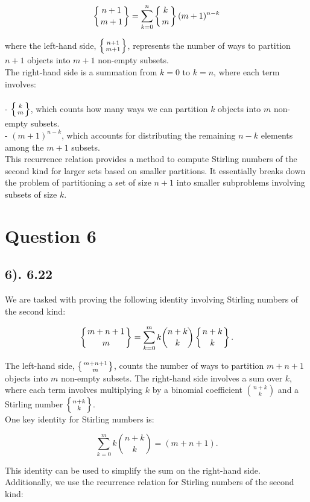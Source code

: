 \documentclass[12pt]{article}
\begin{document}
\[
\left\{ n+1 \atop m+1 \right\} = \sum_{k=0}^{n} \left\{ k \atop m \right\} (m+1)^{n-k}
\]

where the left-hand side, \( \left\{ n+1 \atop m+1 \right\} \), represents the number of ways to partition \( n+1 \) objects into \( m+1 \) non-empty subsets.\\

The right-hand side is a summation from \( k = 0 \) to \( k = n \), where each term involves:\\ \\
- \( \left\{ k \atop m \right\} \), which counts how many ways we can partition \( k \) objects into \( m \) non-empty subsets.\\
- \( (m+1)^{n-k} \), which accounts for distributing the remaining \( n-k \) elements among the \( m+1 \) subsets.\\

This recurrence relation provides a method to compute Stirling numbers of the second kind for larger sets based on smaller partitions. It essentially breaks down the problem of partitioning a set of size \( n+1 \) into smaller subproblems involving subsets of size \( k \).

\section*{Question 6}
\subsection*{6). 6.22}

We are tasked with proving the following identity involving Stirling numbers of the second kind:

\[
\left\{ m + n + 1 \atop m \right\} = \sum_{k=0}^{m} k \binom{n+k}{k} \left\{ n+k \atop k \right\}.
\]

The left-hand side, \( \left\{ m + n + 1 \atop m \right\} \), counts the number of ways to partition \( m + n + 1 \) objects into \( m \) non-empty subsets.
The right-hand side involves a sum over \( k \), where each term involves multiplying \( k \) by a binomial coefficient \( \binom{n+k}{k} \) and a Stirling number \( \left\{ n+k \atop k \right\} \).\\

One key identity for Stirling numbers is:

\[
\sum_{k=0}^{m} k \binom{n+k}{k} = (m+n+1).
\]

This identity can be used to simplify the sum on the right-hand side. Additionally, we use the recurrence relation for Stirling numbers of the second kind:
\end{document}
